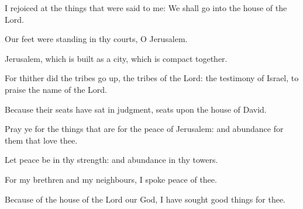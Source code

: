 ﻿\item I rejoiced at the things that were said to me: We shall go into the house of the Lord.
\item Our feet were standing in thy courts, O Jerusalem.
\item Jerusalem, which is built as a city, which is compact together.
\item For thither did the tribes go up, the tribes of the Lord: the testimony of Israel, to praise the name of the Lord.
\item Because their seats have sat in judgment, seats upon the house of David.
\item Pray ye for the things that are for the peace of Jerusalem: and abundance for them that love thee.
\item Let peace be in thy strength: and abundance in thy towers.
\item For my brethren and my neighbours, I spoke peace of thee.
\item Because of the house of the Lord our God, I have sought good things for thee.